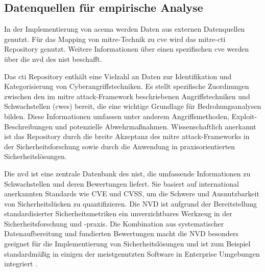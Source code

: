 \subsection{Datenquellen für empirische Analyse}
\par In der Implementierung von \gls{acema} werden Daten aus externen Datenquellen genutzt. Für das Mapping von \gls{mitre}-Technik zu \gls{cve} wird das \gls{mitre}-\gls{cti} Repository genutzt. Weitere Informationen über einen spezifischen \gls{cve} werden über die \gls{nvd} des \gls{nist} beschafft.
\par Das \gls{cti} Repository enthält eine Vielzahl an Daten zur Identifikation und Kategorisierung von Cyberangriffstechniken. Es stellt spezifische Zuordnungen zwischen den im \gls{mitre} \gls{attack}-Framework beschriebenen Angriffstechniken und Schwachstellen (\glspl{cwe}) bereit, die eine wichtige Grundlage für Bedrohungsanalysen bilden. Diese Informationen umfassen unter anderem Angriffsmethoden, Exploit-Beschreibungen und potenzielle Abwehrmaßnahmen. Wissenschaftlich anerkannt ist das Repository durch die breite Akzeptanz des \gls{mitre} \gls{attack}-Frameworks in der Sicherheitsforschung sowie durch die Anwendung in praxisorientierten Sicherheitslösungen.
\par Die \gls{nvd} ist eine zentrale Datenbank des \gls{nist}, die umfassende Informationen zu Schwachstellen und deren Bewertungen liefert. Sie basiert auf international anerkannten Standards wie CVE und CVSS, um die Schwere und Ausnutzbarkeit von Sicherheitslücken zu quantifizieren. Die NVD ist aufgrund der Bereitstellung standardisierter Sicherheitsmetriken ein unverzichtbares Werkzeug in der Sicherheitsforschung und -praxis. Die Kombination aus systematischer Datenaufbereitung und fundierten Bewertungen macht die NVD besonders geeignet für die Implementierung von Sicherheitslösungen und ist zum Beispiel standardmäßig in einigen der meistgenutzten Software in Enterprise Umgebungen integriert \autocite{AssetsNVDIntegration,InformationenNVDIntegrationen}.